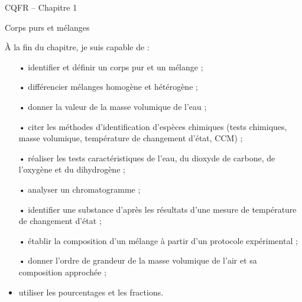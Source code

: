 

\cfoot{} %



\begin{header}
CQFR -- Chapitre 1

Corps purs et mélanges
\end{header}

À la fin du chapitre, je suis capable de :
\begin{itemize}
\item[•] identifier et définir un corps pur et un mélange ;
\item[•] différencier mélanges homogène et hétérogène ;
\item[•] donner la valeur de la masse volumique de l'eau ;
\item[•] citer les méthodes d'identification d'espèces chimiques (tests chimiques, masse volumique, température de changement d'état, CCM) ;
\item[•] réaliser les tests caractéristiques de l'eau, du dioxyde de carbone, de l'oxygène et du dihydrogène ;
\item[•] analyser un chromatogramme ;
\item[•] identifier une substance d'après les résultats d'une mesure de température de changement d'état ;
\item[•] établir la composition d'un mélange à partir d'un protocole expérimental ;
\item[•] donner l'ordre de grandeur de la masse volumique de l'air et sa composition approchée ;
\item utiliser les pourcentages et les fractions.
\end{itemize}

